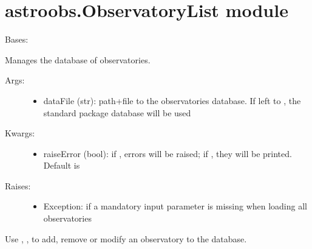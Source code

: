 \documentclass[letterpaper,10pt,english]{sphinxmanual}
\begin{document}
\section{astroobs.ObservatoryList module}
\label{astroobs:astroobs-observatorylist-module}\label{astroobs:module-astroobs.ObservatoryList}

\begin{fulllineitems}
\label{astroobs:astroobs.ObservatoryList.ObservatoryList}
Bases: 

Manages the database of observatories.
\begin{description}
\item[{Args:}] \leavevmode\begin{itemize}
\item {} 
dataFile (str): path+file to the observatories database. If left to , the standard package database will be used

\end{itemize}

\item[{Kwargs:}] \leavevmode\begin{itemize}
\item {} 
raiseError (bool): if , errors will be raised; if , they will be printed. Default is 

\end{itemize}

\item[{Raises:}] \leavevmode\begin{itemize}
\item {} 
Exception: if a mandatory input parameter is missing when loading all observatories

\end{itemize}

\end{description}

Use , ,  to add, remove or modify an observatory to the database.


\end{fulllineitems}
\end{document}
